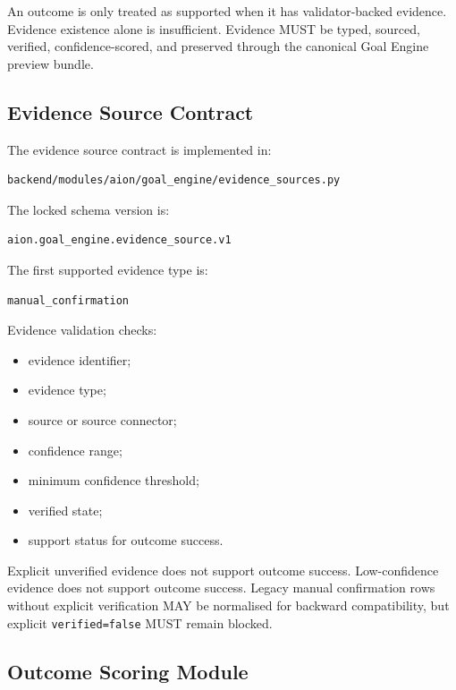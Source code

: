 An outcome is only treated as supported when it has validator-backed evidence. Evidence existence alone is insufficient. Evidence MUST be typed, sourced, verified, confidence-scored, and preserved through the canonical Goal Engine preview bundle.

\subsection{Evidence Source Contract}

The evidence source contract is implemented in:

\begin{verbatim}
backend/modules/aion/goal_engine/evidence_sources.py
\end{verbatim}

The locked schema version is:

\begin{verbatim}
aion.goal_engine.evidence_source.v1
\end{verbatim}

The first supported evidence type is:

\begin{verbatim}
manual_confirmation
\end{verbatim}

Evidence validation checks:

\begin{itemize}
  \item evidence identifier;
  \item evidence type;
  \item source or source connector;
  \item confidence range;
  \item minimum confidence threshold;
  \item verified state;
  \item support status for outcome success.
\end{itemize}

Explicit unverified evidence does not support outcome success. Low-confidence evidence does not support outcome success. Legacy manual confirmation rows without explicit verification MAY be normalised for backward compatibility, but explicit \texttt{verified=false} MUST remain blocked.

\subsection{Outcome Scoring Module}

